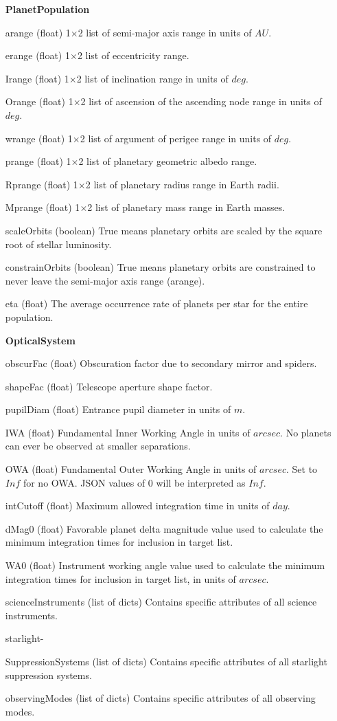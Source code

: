 \documentclass[cleanfoot]{asme2ej}
\begin{document}
\begin{itemize}[leftmargin=1.5in,font={\ttfamily}]
\item[\textbf{PlanetPopulation}]
\item[arange] (float) 1$\times$2 list of semi-major axis range in units of $ AU $. 
\item[erange] (float) 1$\times$2 list of eccentricity range.
\item[Irange] (float) 1$\times$2 list of inclination range in units of $ deg $.  
\item[Orange] (float) 1$\times$2 list of ascension of the ascending node range in units of $ deg $.  
\item[wrange] (float) 1$\times$2 list of argument of perigee range in units of $ deg $. 
\item[prange] (float) 1$\times$2 list of planetary geometric albedo range.  
\item[Rprange] (float) 1$\times$2 list of planetary radius range in Earth radii.  
\item[Mprange] (float) 1$\times$2 list of planetary mass range in Earth masses.  
\item [scaleOrbits] (boolean) True means planetary orbits are scaled by the square root of stellar luminosity. 
\item[constrainOrbits] (boolean) True means planetary orbits are constrained to never leave the semi-major axis range (arange).
\item[eta] (float) The average occurrence rate of planets per star for the entire population.

\item[\textbf{OpticalSystem}]
\item[obscurFac] (float) Obscuration factor due to secondary mirror and spiders.
\item[shapeFac] (float)  Telescope aperture shape factor.
\item[pupilDiam] (float) Entrance pupil diameter in units of $m$.
\item[IWA] (float) Fundamental Inner Working Angle in units of $ arcsec $. No planets can ever be observed at smaller separations.
\item[OWA] (float) Fundamental Outer Working Angle in units of $ arcsec $. Set to $ Inf $ for no OWA. JSON values of 0 will be interpreted as $ Inf $.
\item[intCutoff] (float)  Maximum allowed integration time in units of $ day $.
\item[dMag0] (float) Favorable planet delta magnitude value used to calculate the minimum integration times for inclusion in target list.
\item[WA0] (float) Instrument working angle value used to calculate the minimum integration times for inclusion in target list, in units of $arcsec$.
\item[scienceInstruments] (list of dicts) Contains specific attributes of all science instruments. 
\item[starlight-]
\item[SuppressionSystems] (list of dicts) Contains specific attributes of all starlight suppression systems.
\item[observingModes] (list of dicts) Contains specific attributes of all observing modes. 


\end{itemize}
\end{document}
